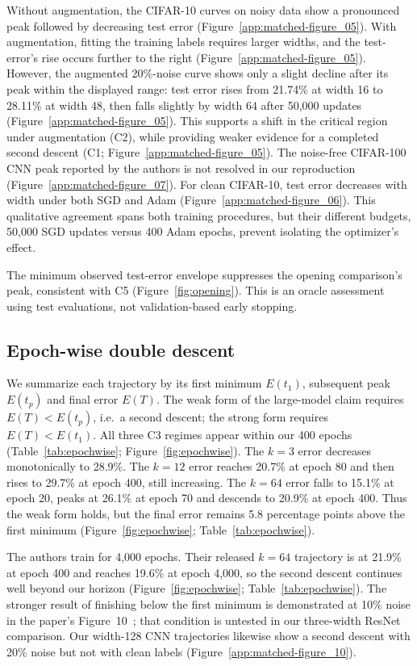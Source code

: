 \documentclass{article}
\begin{document}
Without augmentation, the CIFAR-10 curves on noisy data show a pronounced peak
followed by decreasing test error (Figure~\ref{app:matched-figure_05}). With
augmentation, fitting the training labels requires larger widths, and the
test-error's rise occurs further to the right (Figure~\ref{app:matched-figure_05}). However, the augmented
20\%-noise curve shows only a slight decline after its peak within the
displayed range: test error rises from 21.74\% at width 16 to 28.11\% at
width 48, then falls slightly by width 64 after 50,000 updates
(Figure~\ref{app:matched-figure_05}). This supports a shift in the critical
region under augmentation (C2), while providing weaker evidence for a
completed second descent (C1; Figure~\ref{app:matched-figure_05}). The noise-free CIFAR-100 CNN peak reported
by the authors is not resolved in our reproduction
(Figure~\ref{app:matched-figure_07}). For clean CIFAR-10, test error decreases
with width under both SGD and Adam (Figure~\ref{app:matched-figure_06}).
This qualitative agreement spans both training procedures, but their different
budgets, 50,000 SGD updates versus 400 Adam epochs, prevent isolating the
optimizer's effect.

The minimum observed test-error envelope suppresses the opening comparison's
peak, consistent with C5 (Figure~\ref{fig:opening}). This is an oracle
assessment using test evaluations, not validation-based early stopping.

\subsection{Epoch-wise double descent}\label{sec:epochwise}
We summarize each trajectory by its first minimum $E(t_1)$, subsequent
peak $E(t_p)$ and final error $E(T)$. The weak form of the large-model
claim requires $E(T)<E(t_p)$, i.e.\ a second descent; the strong form
requires $E(T)<E(t_1)$. All three C3 regimes appear within our 400 epochs
(Table~\ref{tab:epochwise}; Figure~\ref{fig:epochwise}). The $k=3$ error
decreases monotonically to 28.9\%. The $k=12$ error reaches 20.7\% at
epoch 80 and then rises to 29.7\% at epoch 400, still increasing. The
$k=64$ error falls to 15.1\% at epoch 20, peaks at 26.1\% at epoch 70 and
descends to 20.9\% at epoch 400. Thus the weak form holds, but the final
error remains 5.8 percentage points above the first minimum
(Figure~\ref{fig:epochwise}; Table~\ref{tab:epochwise}).

The authors train for 4,000 epochs. Their released $k=64$ trajectory is at
21.9\% at epoch 400 and reaches 19.6\% at epoch 4,000, so the second
descent continues well beyond our horizon (Figure~\ref{fig:epochwise};
Table~\ref{tab:epochwise}).
The stronger result of finishing below the first minimum is demonstrated
at 10\% noise in the paper's Figure~10~\cite{nakkiran2021deepdouble}; that
condition is untested in our three-width ResNet comparison. Our width-128
CNN trajectories likewise show a second descent with 20\% noise but not
with clean labels (Figure~\ref{app:matched-figure_10}).
\end{document}
